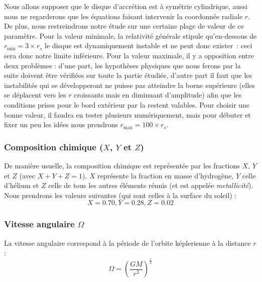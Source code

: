Nous allons supposer que le disque d’accrétion est à symétrie cylindrique,
aussi nous ne regarderons que les équations faisant intervenir la coordonnée
radiale $r$. De plus, nous restreindrons notre étude sur une certaine plage de
valeur de ce paramètre. Pour la valeur minimale, la relativité générale stipule
qu’en-dessous de $r_\mathrm{min} = 3 \times r_s$ le disque est dynamiquement
instable et ne peut donc exister : ceci sera donc notre limite inférieure. Pour
la valeur maximale, il y a opposition entre deux problèmes : d’une part, les
hypothèses physiques que nous ferons par la suite doivent être vérifiées sur
toute la partie étudiée, d’autre part il faut que les instabilités qui se
développeront ne puisse pas atteindre la borne supérieure (elles se déplacent
vers les $r$ croissants mais en diminuant d’amplitude) afin que les conditions
prises pour le bord extérieur par la restent valables. Pour choisir une bonne
valeur, il faudra en tester plusieurs numériquement, mais pour débuter et fixer
un peu les idées nous prendrons $r_\mathrm{max} = 100 \times r_s$.

\subsubsection{\texorpdfstring{Composition chimique ($X$, $Y$ et $Z$)}{Composition chimique (X, Y et Z)}}

De manière usuelle, la composition chimique est représentée par les fractions
$X$, $Y$ et $Z$ (avec $X + Y + Z = 1$). $X$ représente la fraction en masse
d’hydrogène, $Y$ celle d’hélium et $Z$ celle de tous les autres éléments réunis
(et est appelée \textit{metallicité}). Nous prendrons les valeurs suivantes
(qui sont celles à la surface du soleil) :
\begin{equation}
    \label{eq:compo_chimique}
    X = 0.70, Y = 0.28, Z = 0.02
\end{equation}

\subsubsection{\texorpdfstring{Vitesse angulaire $\Omega$}{Vitesse angulaire Ω}}

La vitesse angulaire correspond à la période de l’orbite képlerienne à la
distance $r$ :
\begin{equation}
    \label{eq:vitesse_angulaire}
    \Omega = \left( \frac{G M}{r^3} \right)^\frac{1}{2}
\end{equation}

